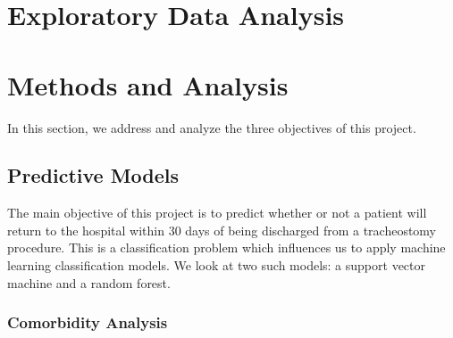 \documentclass[sn-basic,pdflatex]{sn-jnl}
\theoremstyle{remark}
\theoremstyle{definition}
\begin{document}
\hypertarget{sec3}{%
\section{Exploratory Data Analysis}\label{sec3}}

\hypertarget{sec4}{%
\section{Methods and Analysis}\label{sec4}}

In this section, we address and analyze the three objectives of this
project.

\hypertarget{sec4A}{%
\subsection{Predictive Models}\label{sec4A}}

The main objective of this project is to predict whether or not a
patient will return to the hospital within 30 days of being discharged
from a tracheostomy procedure. This is a classification problem which
influences us to apply machine learning classification models. We look
at two such models: a support vector machine and a random forest.

\hypertarget{sec4AA}{%
\subsubsection{Comorbidity Analysis}\label{sec4AA}}
\end{document}
